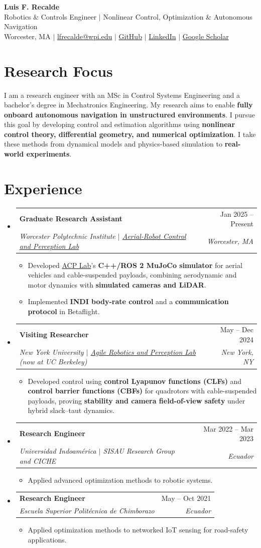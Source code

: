 \documentclass[letterpaper,11pt]{article}
\makeatletter
\newcommand{\resumeItem}[1]{
  \item {\small #1\par}\vspace{-2pt}
}
\newcommand{\resumeSubheading}[4]{
  \vspace{-2pt}\item
    \begin{tabular*}{0.97\textwidth}[t]{l@{\extracolsep{\fill}}r}
      \textbf{#1} & #2 \\
      \textit{\small#3} & \textit{\small #4} \\
    \end{tabular*}\vspace{-7pt}
}
\newcommand{\resumeSubHeadingListStart}{\begin{itemize}[leftmargin=0.15in, label={}, topsep=3pt]}
\newcommand{\resumeSubHeadingListEnd}{\end{itemize}}
\newcommand{\resumeItemListStart}{\begin{itemize}}
\newcommand{\resumeItemListEnd}{\end{itemize}\vspace{-5pt}}
\makeatother
\begin{document}
\begin{center}
\textcolor{AuthorTeal}{\textbf{\Huge Luis F. Recalde}} \\ \vspace{3pt}
\small Robotics \& Controls Engineer $|$ Nonlinear Control, Optimization \& Autonomous Navigation \\ \vspace{3pt}
Worcester, MA $|$ \href{mailto:lfrecalde@wpi.edu}{lfrecalde@wpi.edu} $|$
\href{https://github.com/lfrecalde1}{GitHub} $|$
\href{https://www.linkedin.com/in/luis-f-recalde-8a6432123}{LinkedIn} $|$
\href{https://scholar.google.com/citations?user=_v1511cAAAAJ}{Google Scholar}
\end{center}
\vspace{-12pt}
\section{Research Focus}
{\small I am a research engineer with an MSc in Control Systems Engineering and a bachelor's degree in Mechatronics Engineering.
My research aims to enable \textbf{fully onboard autonomous navigation in unstructured environments}.
I pursue this goal by developing control and estimation algorithms using \textbf{nonlinear control theory, differential geometry, and numerical optimization}.
I take these methods from dynamical models and physics-based simulation to \textbf{real-world experiments}.\par}
\section{Experience}
\resumeSubHeadingListStart
\resumeSubheading{Graduate Research Assistant}{Jan 2025 -- Present}
{Worcester Polytechnic Institute $|$ \href{https://acp-lab.github.io/acplab-web/}{Aerial-Robot Control and Perception Lab}}{Worcester, MA}
\resumeItemListStart
\resumeItem{Developed \href{https://acp-lab.github.io/acplab-web/}{ACP Lab}'s \textbf{C++/ROS 2 MuJoCo simulator} for aerial vehicles and cable-suspended payloads, combining aerodynamic and motor dynamics with \textbf{simulated cameras and LiDAR}.}
\resumeItem{Implemented \textbf{INDI body-rate control} and a \textbf{communication protocol} in Betaflight.}
\resumeItemListEnd
\resumeSubheading{Visiting Researcher}{May -- Dec 2024}
{New York University $|$ \href{https://arplaboratory.github.io/}{Agile Robotics and Perception Lab} (now at UC Berkeley)}{New York, NY}
\resumeItemListStart
\resumeItem{Developed control using \textbf{control Lyapunov functions (CLFs)} and \textbf{control barrier functions (CBFs)} for quadrotors with cable-suspended payloads, proving \textbf{stability and camera field-of-view safety} under hybrid slack--taut dynamics.}
\resumeItemListEnd
\resumeSubheading{Research Engineer}{Mar 2022 -- Mar 2023}
{Universidad Indoam\'erica $|$ SISAU Research Group and CICHE}{Ecuador}
\resumeItemListStart
\resumeItem{Applied advanced optimization methods to robotic systems.}
\resumeItemListEnd
\resumeSubheading{Research Engineer}{May -- Oct 2021}
{Escuela Superior Polit\'ecnica de Chimborazo}{Ecuador}
\resumeItemListStart
\resumeItem{Applied optimization methods to networked IoT sensing for road-safety applications.}
\resumeItemListEnd
\resumeSubHeadingListEnd
\end{document}
